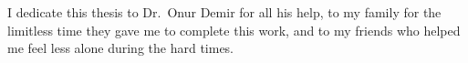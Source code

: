 \begin{dedication}

I dedicate this thesis to Dr.~Onur Demir for all his help, to my family for the limitless time they gave me to complete this work, and to my friends who helped me feel less alone during the hard times.

\end{dedication}
